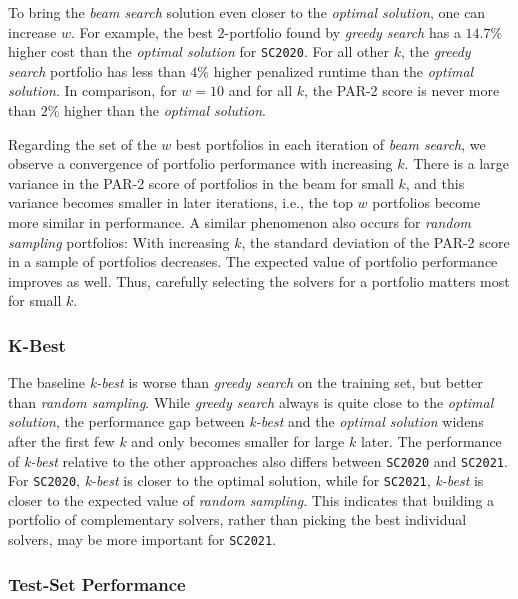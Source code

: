\documentclass[conference]{IEEEtran}
\begin{document}
To bring the \emph{beam search} solution even closer to the \emph{optimal solution}, one can increase $w$.
For example, the best $2$-portfolio found by \emph{greedy search} has a $14.7\%$ higher cost than the \emph{optimal solution} for \texttt{SC2020}.
For all other $k$, the \emph{greedy search} portfolio has less than $4\%$ higher penalized runtime than the \emph{optimal solution}.
In comparison, for $w=10$ and for all $k$, the PAR-2 score is never more than $2\%$ higher than the \emph{optimal solution}.

Regarding the set of the $w$ best portfolios in each iteration of \emph{beam search}, we observe a convergence of portfolio performance with increasing $k$. 
There is a large variance in the PAR-2 score of portfolios in the beam for small $k$, and this variance becomes smaller in later iterations, i.e., the top $w$ portfolios become more similar in performance.
A similar phenomenon also occurs for \emph{random sampling} portfolios:
With increasing $k$, the standard deviation of the PAR-2 score in a sample of portfolios decreases.
The expected value of portfolio performance improves as well.
Thus, carefully selecting the solvers for a portfolio matters most for small $k$.

\subsubsection{K-Best}

The baseline \emph{k-best} is worse than \emph{greedy search} on the training set, but better than \emph{random sampling}.
While \emph{greedy search} always is quite close to the \emph{optimal solution}, the performance gap between \emph{k-best} and the \emph{optimal solution} widens after the first few $k$ and only becomes smaller for large $k$ later.
The performance of \emph{k-best} relative to the other approaches also differs between \texttt{SC2020} and \texttt{SC2021}.
For \texttt{SC2020}, \emph{k-best} is closer to the optimal solution, while for \texttt{SC2021}, \emph{k-best} is closer to the expected value of \emph{random sampling}.
This indicates that building a portfolio of complementary solvers, rather than picking the best individual solvers, may be more important for \texttt{SC2021}. 

\subsubsection{Test-Set Performance}
\end{document}
